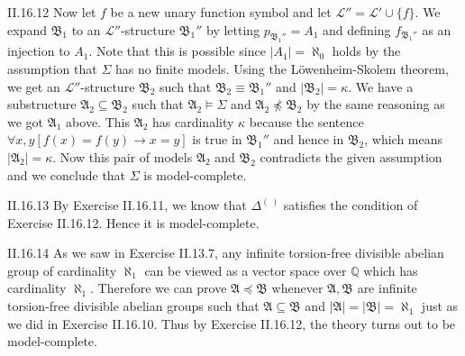 \documentclass[12pt]{article}
\begin{document}
\begin{customthm}{II.16.12}
  Now let $f$ be a new unary function symbol and let $\mathcal{L}''=\mathcal{L}'\cup\{f\}$. We expand $\mathfrak{B}_1$ to an $\mathcal{L}''$-structure $\mathfrak{B}_1''$ by letting $p_{\mathfrak{B}_1''}=A_1$ and defining $f_{\mathfrak{B}_1''}$ as an injection to $A_1$. Note that this is possible since $|A_1|=\aleph_0$ holds by the assumption that $\Sigma$ has no finite models. Using the Löwenheim-Skolem theorem, we get an $\mathcal{L}''$-structure $\mathfrak{B}_2$ such that $\mathfrak{B}_2\equiv\mathfrak{B}_1''$ and $|\mathfrak{B}_2|=\kappa$. We have a substructure $\mathfrak{A}_2\subseteq\mathfrak{B}_2$ such that $\mathfrak{A}_2\models\Sigma$ and $\mathfrak{A}_2\not\preccurlyeq\mathfrak{B}_2$ by the same reasoning as we got $\mathfrak{A}_1$ above. This $\mathfrak{A}_2$ has cardinality $\kappa$ because the sentence $\forall x,y[f(x)=f(y)\rightarrow x=y]$ is true in $\mathfrak{B}_1''$ and hence in $\mathfrak{B}_2$, which means $|\mathfrak{A}_2|=\kappa$. Now this pair of models $\mathfrak{A}_2$ and $\mathfrak{B}_2$ contradicts the given assumption and we conclude that $\Sigma$ is model-complete.
\end{customthm}

\begin{customthm}{II.16.13}
  By Exercise II.16.11, we know that $\Delta^{(~)}$ satisfies the condition of Exercise II.16.12. Hence it is model-complete.
\end{customthm}

\begin{customthm}{II.16.14}
  As we saw in Exercise II.13.7, any infinite torsion-free divisible abelian group of cardinality $\aleph_1$ can be viewed as a vector space over $\mathbb{Q}$ which has cardinality $\aleph_1$. Therefore we can prove $\mathfrak{A}\preccurlyeq\mathfrak{B}$ whenever $\mathfrak{A},\mathfrak{B}$ are infinite torsion-free divisible abelian groups such that $\mathfrak{A}\subseteq\mathfrak{B}$ and $|\mathfrak{A}|=|\mathfrak{B}|=\aleph_1$ just as we did in Exercise II.16.10. Thus by Exercise II.16.12, the theory turns out to be model-complete.
\end{customthm}
\end{document}
